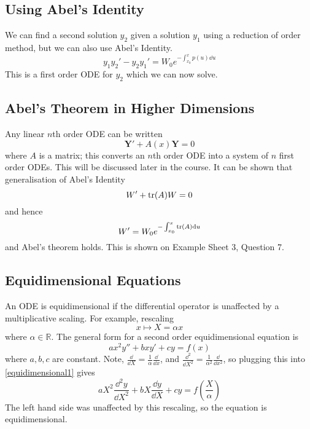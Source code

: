 \documentclass{article}
\begin{document}
	\subsection{Using Abel's Identity}
	We can find a second solution $y_2$ given a solution $y_1$ using a reduction of order method, but we can also use Abel's Identity.
	\[ y_1y_2' - y_2y_1' = W_0 e^{-\int_{x_0}^x p(u) \dd u} \]
	This is a first order ODE for $y_2$ which we can now solve.

	\subsection{Abel's Theorem in Higher Dimensions}
	Any linear $n$th order ODE can be written
	\[\bm Y' + A(x) \bm Y = 0 \]
	where $A$ is a matrix; this converts an $n$th order ODE into a system of $n$ first order ODEs. This will be discussed later in the course. It can be shown that generalisation of Abel's Identity
	\[ W' + \tr(A)W = 0 \]
	and hence
	\[ W' = W_0e^{-\int_{x_0}^x \tr(A) \dd u} \]
	and Abel's theorem holds. This is shown on Example Sheet 3, Question 7.

	\subsection{Equidimensional Equations}
	An ODE is equidimensional if the differential operator is unaffected by a multiplicative scaling. For example, rescaling
	\[ x \mapsto X = \alpha x \]
	where $\alpha \in \mathbb R$. The general form for a second order equidimensional equation is
	\begin{equation}\label{equidimensional1}
		ax^2 y'' + bxy' + cy = f(x)
	\end{equation}
	where $a, b, c$ are constant. Note, $\frac{\dd}{\dd X} = \frac{1}{\alpha}\frac{\dd}{\dd x}$, and $\frac{\dd^2}{\dd X^2} = \frac{1}{\alpha^2}\frac{\dd}{\dd x^2}$, so plugging this into \eqref{equidimensional1} gives
	\[ aX^2\frac{\dd^2 y}{\dd X^2} + bX\frac{\dd y}{\dd X} + cy = f\left(\frac{X}{\alpha}\right) \]
	The left hand side was unaffected by this rescaling, so the equation is equidimensional.
\end{document}
